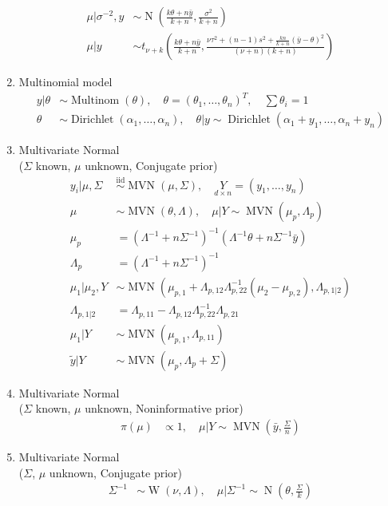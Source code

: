 \documentclass[10pt,landscape]{article}
\newcommand{\N}{\operatorname{N}}
\newcommand{\Multinom}{\operatorname{Multinom}}
\newcommand{\Dirich}{\operatorname{Dirichlet}}
\newcommand{\MVN}{\operatorname{MVN}}
\newcommand{\W}{\operatorname{W}}
\newcommand{\iid}{\overset{\text{iid}}{\sim}}
\begin{document}
\begin{multicols}{3}
\begin{enumerate}
\begin{align*}
    \mu | \sigma^{-2}, y & \sim \N(\frac{k\theta+n\bar{y}}{k+n}, \frac{\sigma^2}{k+n}) \\
    \mu | y & \sim t_{\nu+k}\left(\frac{k\theta+n\bar{y}}{k+n}, \frac{\nu\tau^2+(n-1)s^2+\frac{kn}{k+n}(\bar{y}-\theta)^2}{(\nu+n)(k+n)}\right)
  \end{align*}
\item Multinomial model
  \begin{align*}
    y | \theta & \sim \Multinom(\theta), \quad \theta = (\theta_1, \ldots, \theta_n)^T, \quad \sum \theta_i = 1 \\
    \theta & \sim \Dirich(\alpha_1, \ldots, \alpha_n), \quad 
    \theta | y \sim \Dirich(\alpha_1 + y_1, \ldots, \alpha_n + y_n)
  \end{align*}
\item Multivariate Normal \\
  ($\Sigma$ known, $\mu$ unknown, Conjugate prior)
    \begin{align*}
      y_i | \mu, \Sigma & \iid \MVN(\mu, \Sigma), \quad \underset{d \times n}{Y} = (y_1, \ldots, y_n)\\
      \mu & \sim \MVN(\theta, \Lambda), \quad \mu | Y \sim \MVN(\mu_p, \Lambda_p) \\
      \mu_p & = (\Lambda^{-1} + n\Sigma^{-1})^{-1}(\Lambda^{-1}\theta + n\Sigma^{-1}\bar{y}) \\
      \Lambda_p & = (\Lambda^{-1} + n\Sigma^{-1})^{-1} \\
      \mu_1 | \mu_2, Y & \sim \MVN(\mu_{p,1} + \Lambda_{p,12}\Lambda_{p,22}^{-1}(\mu_2 - \mu_{p,2}), \Lambda_{p,1|2}) \\
      \Lambda_{p,1|2} & = \Lambda_{p,11} - \Lambda_{p,12}\Lambda_{p,22}^{-1}\Lambda_{p,21} \\
      \mu_1 | Y & \sim \MVN(\mu_{p,1}, \Lambda_{p,11}) \\
      \tilde{y} | Y & \sim \MVN(\mu_p, \Lambda_p + \Sigma)
    \end{align*}
\item Multivariate Normal \\
  ($\Sigma$ known, $\mu$ unknown, Noninformative prior)
  \begin{align*}
      \pi(\mu) & \propto 1, \quad \mu | Y \sim \MVN(\bar{y}, \frac{\Sigma}{n})
  \end{align*}
\item Multivariate Normal \\
  ($\Sigma$, $\mu$ unknown, Conjugate prior)
  \begin{align*}
    \Sigma^{-1} & \sim \W(\nu, \Lambda), \quad \mu | \Sigma^{-1} \sim \N(\theta, \frac{\Sigma}{k}) \\

\end{align*}
\end{enumerate}
\end{multicols}
\end{document}
